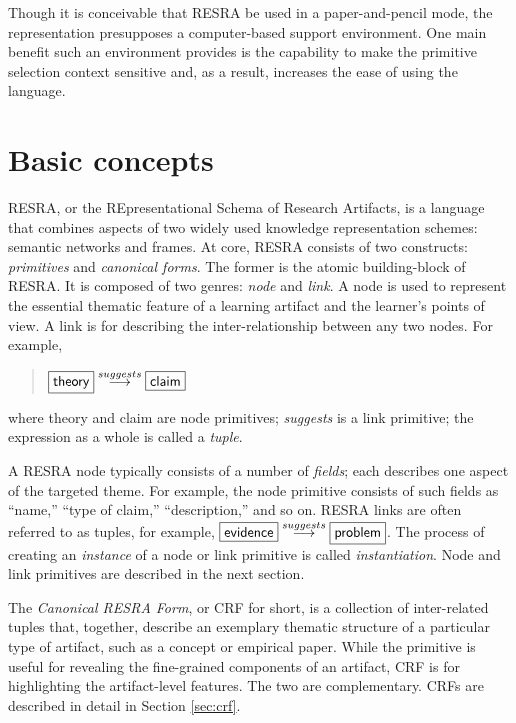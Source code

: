 Though it is conceivable that RESRA be used in a paper-and-pencil mode, the
representation presupposes a computer-based support environment. One main
benefit such an environment provides is the capability to make the
primitive selection context sensitive and, as a result, increases the ease
of using the language.


\section{Basic concepts}
\label{sec:concepts}

RESRA, or the REpresentational Schema of Research Artifacts, is a language
that combines aspects of two widely used knowledge representation schemes:
semantic networks and frames. At core, RESRA consists of two constructs:
{\it primitives\/} and {\it canonical forms\/}. The former is the atomic
building-block of RESRA. It is composed of two genres: {\it node\/} and
{\it link\/}. A node is used to represent the essential thematic feature of
a learning artifact and the learner's points of view. A link is for
describing the inter-relationship between any two nodes. For example,

\begin{quotation}
 \( \fbox{{\sf theory}} \stackrel{suggests}{\longrightarrow} \fbox{{\sf
 claim}} \)
\end{quotation}

where {\sf theory\/} and {\sf claim\/} are node primitives; {\it
suggests\/} is a link primitive; the expression as a whole is called a {\sl
tuple\/}.

A RESRA node typically consists of a number of {\it fields\/}; each
describes one aspect of the targeted theme. For example, the node primitive
 consists of such fields as ``name,'' ``type of
claim,'' ``description,'' and so on. RESRA links are often referred to as
tuples, for example, \( \fbox{{\sf evidence}}
\stackrel{suggests}{\longrightarrow} \fbox{{\sf problem}} \).  The process
of creating an {\it instance\/} of a node or link primitive is called {\it
instantiation\/}. Node and link primitives are described in the next
section.

The {\it Canonical RESRA Form\/}, or CRF for short, is a collection of
inter-related tuples that, together, describe an exemplary thematic
structure of a particular type of artifact, such as a concept or empirical
paper. While the primitive is useful for revealing the fine-grained
components of an artifact, CRF is for highlighting the artifact-level
features. The two are complementary. CRFs are described in detail in
Section \ref{sec:crf}.


